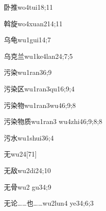 \begin{verbete}{卧推}{wo4tui1}{8;11}
\end{verbete}

\begin{verbete}{斡旋}{wo4xuan2}{14;11}
\end{verbete}

\begin{verbete}{乌龟}{wu1gui1}{4;7}
\end{verbete}

\begin{verbete}{乌克兰}{wu1ke4lan2}{4;7;5}
\end{verbete}

\begin{verbete}{污染}{wu1ran3}{6;9}
\end{verbete}

\begin{verbete}{污染区}{wu1ran3qu1}{6;9;4}
\end{verbete}

\begin{verbete}{污染物}{wu1ran3wu4}{6;9;8}
\end{verbete}

\begin{verbete}{污染物质}{wu1ran3 wu4zhi4}{6;9;8;8}
\end{verbete}

\begin{verbete}{污水}{wu1shui3}{6;4}
\end{verbete}

\begin{verbete}{无}{wu2}{4}[71]
\end{verbete}

\begin{verbete}{无敌}{wu2di2}{4;10}
\end{verbete}

\begin{verbete}{无骨}{wu2 gu3}{4;9}
\end{verbete}

\begin{verbete}{无论……也……}{wu2lun4 ye3}{4;6;3}
\end{verbete}

